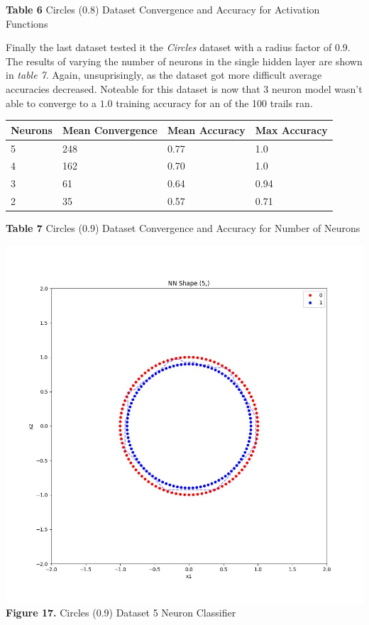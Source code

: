 \documentclass[11pt]{article}
\begin{document}
\textbf{Table 6} Circles (0.8) Dataset Convergence and Accuracy for
Activation Functions

Finally the last dataset tested it the \emph{Circles} dataset with a
radius factor of 0.9. The results of varying the number of neurons in
the single hidden layer are shown in \emph{table 7}. Again,
unsuprisingly, as the dataset got more difficult average accuracies
decreased. Noteable for this dataset is now that 3 neuron model wasn't
able to converge to a \(1.0\) training accuracy for an of the 100 trails
ran.

\begin{longtable}[]{@{}llll@{}}
\toprule
Neurons & Mean Convergence & Mean Accuracy & Max Accuracy \\
\midrule
\endhead
5 & 248 & 0.77 & 1.0 \\
4 & 162 & 0.70 & 1.0 \\
3 & 61 & 0.64 & 0.94 \\
2 & 35 & 0.57 & 0.71 \\
\bottomrule
\end{longtable}

\textbf{Table 7} Circles (0.9) Dataset Convergence and Accuracy for
Number of Neurons

\includegraphics{figures/cir09_5_clf.jpg}\\
\textbf{Figure 17.} Circles (0.9) Dataset 5 Neuron Classifier
\end{document}
